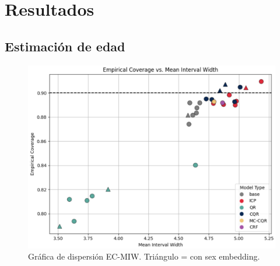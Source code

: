 
\section{Resultados}

\subsection{Estimación de edad}




\begin{figure}[h]
    \centering
    \includegraphics[width=\textwidth]{capitulos/cap_05/imagenes/EC-MIW.png}
    \caption[
        Gráfica de dispersión EC-MIW
    ]{
        Gráfica de dispersión EC-MIW. Triángulo = con sex embedding. 
    }
    \label{fig:ec-miw}
\end{figure}


